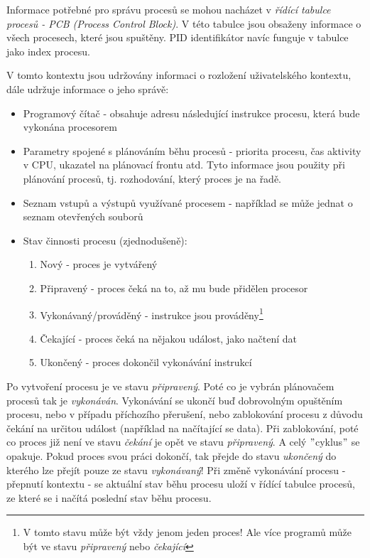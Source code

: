 Informace potřebné pro správu procesů se mohou nacházet v \textit{řídící tabulce procesů - PCB (Process Control Block)}. V této tabulce jsou obsaženy informace o všech procesech, které jsou spuštěny. PID identifikátor navíc funguje v tabulce jako index procesu. 

\vspace{0,5cm}

V tomto kontextu jsou udržovány informaci o rozložení uživatelského kontextu, dále udržuje informace o jeho správě:
\begin{itemize}
    \item Programový čítač - obsahuje adresu následující instrukce procesu, která bude vykonána procesorem
    \item Parametry spojené s plánováním běhu procesů - priorita procesu, čas aktivity v CPU, ukazatel na plánovací frontu atd. Tyto informace jsou použity při plánování procesů, tj. rozhodování, který proces je na řadě. 
    \item Seznam vstupů a výstupů využívané procesem - například se může jednat o seznam otevřených souborů
    
    \newpage
    
    \item Stav činnosti procesu (zjednodušeně):
    \begin{enumerate}
        \item Nový - proces je vytvářený
        \item Připravený - proces čeká na to, až mu bude přidělen procesor
        \item Vykonávaný/prováděný - instrukce jsou prováděny\footnote{V tomto stavu může být vždy jenom jeden proces! Ale více programů může být ve stavu \textit{připravený} nebo \textit{čekající}}
        \item Čekající - proces čeká na nějakou událost, jako načtení dat
        \item Ukončený - proces dokončil vykonávání instrukcí
    \end{enumerate}
\end{itemize}

Po vytvoření procesu je ve stavu \textit{připravený}. Poté co je vybrán plánovačem procesů tak je \textit{vykonáván}. Vykonávání se ukončí buď dobrovolným opuštěním procesu, nebo v případu příchozího přerušení, nebo zablokování procesu z důvodu čekání na určitou událost (například na načítající se data). Při zablokování, poté co proces již není ve stavu \textit{čekání} je opět ve stavu \textit{připravený}. A celý $"$cyklus$"$ se opakuje. Pokud proces svou práci dokončí, tak přejde do stavu \textit{ukončený} do kterého lze přejít pouze ze stavu \textit{vykonávaný}! Při změně vykonávání procesu - přepnutí kontextu - se aktuální stav běhu procesu uloží v řídící tabulce procesů, ze které se i načítá poslední stav běhu procesu.

